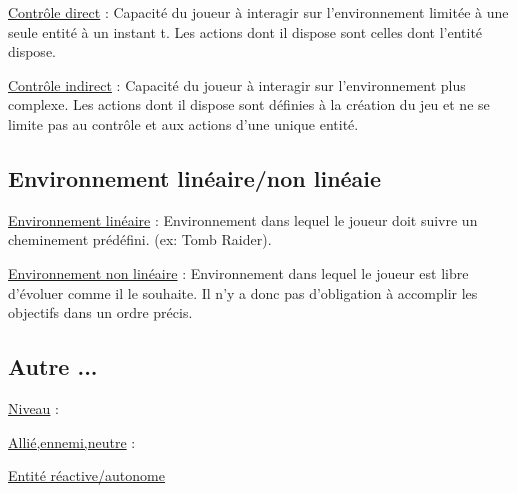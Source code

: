 \underline{Contrôle direct} :
Capacité du joueur à interagir sur l’environnement limitée à une seule entité à un instant t. 
Les actions dont il dispose sont celles dont l'entité dispose.

\underline{Contrôle indirect} :
Capacité du joueur à interagir sur l’environnement plus complexe. 
Les actions dont il dispose sont définies à la création du jeu et ne se limite pas au contrôle et aux actions d'une unique entité.

\subsection*{Environnement linéaire/non linéaie}

\underline{Environnement linéaire} : 
Environnement dans lequel le joueur doit suivre un cheminement prédéfini. (ex: Tomb Raider).

\underline{Environnement non linéaire} : 
Environnement dans lequel le joueur est libre d'évoluer comme il le souhaite. 
Il n'y a donc pas d'obligation à accomplir les objectifs dans un ordre précis.


\subsection*{Autre ...}

\underline{Niveau} :

\underline{Allié,ennemi,neutre} :

\underline{Entité réactive/autonome}

